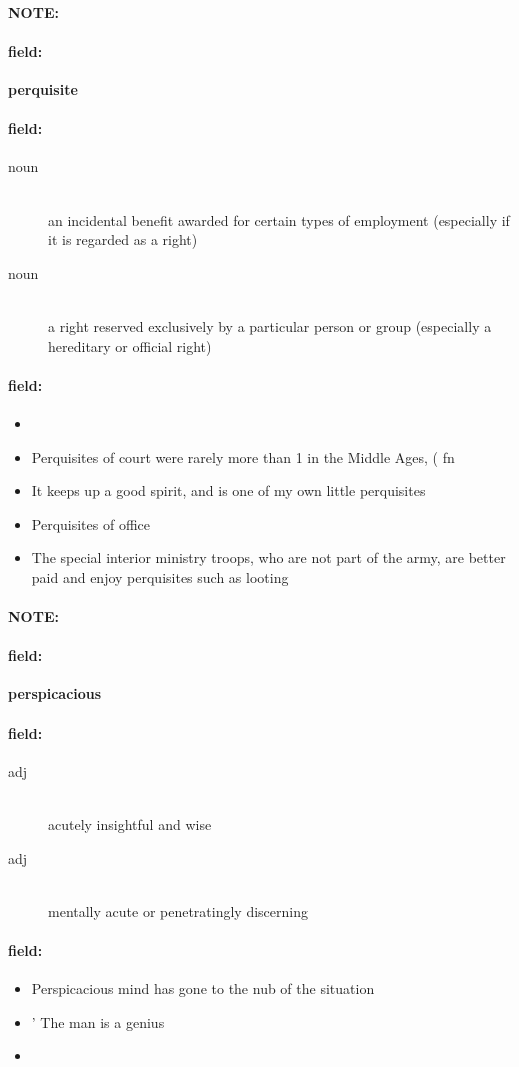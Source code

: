 \documentclass[12pt]{article}
\newenvironment{note}{\paragraph{NOTE:}}{}
\newenvironment{field}{\paragraph{field:}}{}
\begin{document}
\begin{note}
\begin{field}
\textbf{\large perquisite}
\end{field}


\begin{field}
\begin{description}
\item[noun] \hfill \\ 
an incidental benefit awarded for certain types of employment (especially if it is regarded as a right)

\item[noun] \hfill \\ 
a right reserved exclusively by a particular person or group (especially a hereditary or official right)

\end{description}
\end{field}

\begin{field}
\begin{itemize}
\item 
\item Perquisites of court were rarely more than  1 in the Middle Ages, ( fn
\item It keeps up a good spirit, and is one of my own little perquisites
\item Perquisites of office
\item The special interior ministry troops, who are not part of the army, are better paid and enjoy perquisites such as looting
\end{itemize}
\end{field}
\end{note}
\begin{note}
\begin{field}
\textbf{\large perspicacious}
\end{field}


\begin{field}
\begin{description}
\item[adj] \hfill \\ 
acutely insightful and wise

\item[adj] \hfill \\ 
mentally acute or penetratingly discerning

\end{description}
\end{field}

\begin{field}
\begin{itemize}
\item Perspicacious mind has gone to the nub of the situation
\item  ' The man is a genius
\item 
\end{itemize}
\end{field}
\end{note}
\end{document}
